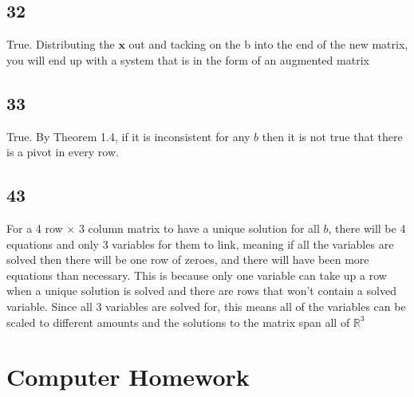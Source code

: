 \documentclass{article}
\begin{document}
\subsection*{32}
True. Distributing the $\mathbf{x}$ out and tacking on the b into the end of the new matrix, you will end up with a system that is in the form of an augmented matrix
\subsection*{33}
True. By Theorem 1.4, if it is inconsistent for any $b$ then it is not true that there is a pivot in every row.
\subsection*{43}
For a 4 row $\times$ 3 column matrix to have a unique solution for all $b$, there will be 4 equations and only 3 variables for them to link, meaning if all the variables are solved then there will be one row of zeroes, and there will have been more equations than necessary.
This is because only one variable can take up a row when a unique solution is solved and there are rows that won't contain a solved variable. Since all 3 variables are solved for, this means all of the variables can be scaled to different amounts and the solutions to the matrix span
all of $\mathbb{R}^3$
\section*{Computer Homework}
\end{document}
